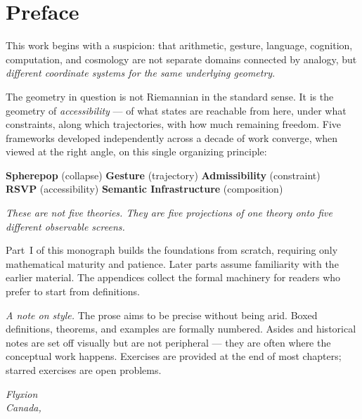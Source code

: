 
\chapter*{Preface}

This work begins with a suspicion: that arithmetic, gesture, language,
cognition, computation, and cosmology are not separate domains connected by
analogy, but \emph{different coordinate systems for the same underlying
geometry}.

The geometry in question is not Riemannian in the standard sense. It is the
geometry of \emph{accessibility} — of what states are reachable from here,
under what constraints, along which trajectories, with how much remaining
freedom. Five frameworks developed independently across a decade of work
converge, when viewed at the right angle, on this single organizing principle:

\medskip
\begin{tcolorbox}[
  enhanced, colback=RSVPdeep, colframe=RSVPdeep,
  coltext=white, arc=6pt, boxrule=0pt,
  left=8mm, right=8mm, top=6mm, bottom=6mm
]
  \begin{center}
    \large
    \textbf{Spherepop} (collapse) \quad
    \textbf{Gesture} (trajectory) \quad
    \textbf{Admissibility} (constraint)\\[4pt]
    \textbf{RSVP} (accessibility) \quad
    \textbf{Semantic Infrastructure} (composition)
  \end{center}
  \medskip
  \normalsize\itshape
  These are not five theories. They are five projections of one theory onto
  five different observable screens.
\end{tcolorbox}
\medskip

Part~I of this monograph builds the foundations from scratch, requiring only
mathematical maturity and patience. Later parts assume familiarity with the
earlier material. The appendices collect the formal machinery for readers who
prefer to start from definitions.

\medskip
\noindent\textit{A note on style.} The prose aims to be precise without being
arid. Boxed definitions, theorems, and examples are formally numbered. Asides
and historical notes are set off visually but are not peripheral — they are
often where the conceptual work happens. Exercises are provided at the end of
most chapters; starred exercises are open problems.

\bigskip
\begin{flushright}
  \textit{Flyxion}\\
  \textit{Canada, \the\year}
\end{flushright}
